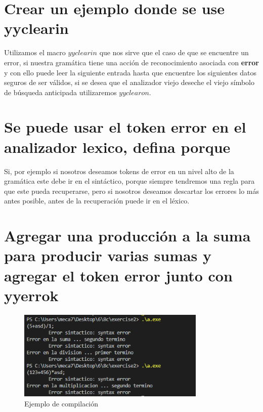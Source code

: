 \documentclass[12pt]{article}
\begin{document}
\section{Crear un ejemplo donde se use yyclearin}

Utilizamos el macro $yyclearin$ que nos sirve que el caso de que se encuentre un error, si nuestra gramática tiene una acción de reconocimiento asociada con \textbf{error} y con ello puede leer la siguiente entrada hasta que encuentre los siguientes datos seguros de ser válidos, si se desea que el analizador viejo deseche el viejo símbolo de búsqueda anticipada utilizaremos $yyclearon$.

\section{Se puede usar el token error en el analizador lexico, defina porque}

Si, por ejemplo si nosotros deseamos tokens de error en un nivel alto de la gramática este debe ir en el sintáctico, porque siempre tendremos una regla para que este pueda recuperarse, pero si nosotros deseamos descartar los errores lo más antes posible, antes de la recuperación puede ir en el léxico.

\section{Agregar una producción a la suma para producir varias sumas y agregar el token error junto con yyerrok}

\begin{figure}[h]
    \centering
    \includegraphics[width=0.8\textwidth]{images/CaptureC01.PNG}
    \caption{Ejemplo de compilación}
\end{figure}

    
\end{document}
